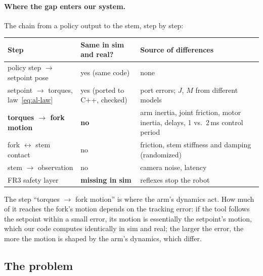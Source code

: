 \paragraph{Where the gap enters our system.} The chain from a policy output to the stem, step by step:
\begin{center}
{\renewcommand{\arraystretch}{1.15}
\begin{tabular}{>{\raggedright\arraybackslash}p{}>{\raggedright\arraybackslash}p{}>{\raggedright\arraybackslash}p{}}
  \toprule
  Step & Same in sim and real? & Source of differences \\
  \midrule
  policy step $\to$ setpoint pose & yes (same code) & none \\
  setpoint $\to$ torques, law~\eqref{eq:al-law} & yes (ported to C++, checked) & port errors; $J$, $M$ from different
    models \\
  \textbf{torques $\to$ fork motion} & \textbf{no} & arm inertia, joint friction, motor inertia, delays, 1 vs.\ 2\,ms
    control period \\
  fork $\leftrightarrow$ stem contact & no & friction, stem stiffness and damping (randomized) \\
  stem $\to$ observation & no & camera noise, latency \\
  FR3 safety layer & \textbf{missing in sim} & reflexes stop the robot \\
  \bottomrule
\end{tabular}}
\end{center}
The step ``torques $\to$ fork motion'' is where the arm's dynamics act. How much of it reaches the fork's motion
depends on the tracking error: if the tool follows the setpoint within a small error, its motion is essentially the
setpoint's motion, which our code computes identically in sim and real; the larger the error, the more the motion is
shaped by the arm's dynamics, which differ.

\subsection{The problem}
\label{sec:al-problem}

